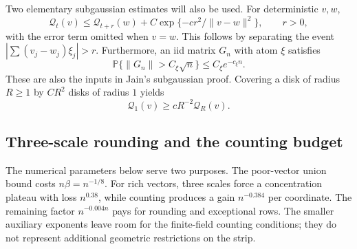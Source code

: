 \documentclass[11pt,reqno]{amsart}
\numberwithin{equation}{section}
\theoremstyle{plain}
\theoremstyle{definition}
\theoremstyle{remark}
\providecommand{\blsvP}{\mathbb P}
\providecommand{\blsvQ}{\mathcal Q}
\begin{document}
Two elementary subgaussian estimates will also be used. For deterministic
$v,w$,
\begin{equation}\label{blsv:eq-perturb-q}
 \blsvQ_t(v)\le\blsvQ_{t+r}(w)
       +C\exp\{-cr^2/\|v-w\|^2\},\qquad r>0,
\end{equation}
with the error term omitted when $v=w$. This follows by separating the
event $|\sum(v_j-w_j)\xi_j|>r$. Furthermore, an iid matrix $G_n$ with
atom $\xi$ satisfies
\begin{equation}\label{blsv:eq-norm-iid}
 \blsvP\{\|G_n\|>C_\xi\sqrt n\}\le C_\xi e^{-c_\xi n}.
\end{equation}
These are also the inputs in Jain's subgaussian proof. Covering a disk
of radius $R\ge1$ by $CR^2$ disks of radius $1$ yields
\begin{equation}\label{blsv:eq-cover-q}
 \blsvQ_1(v)\ge cR^{-2}\blsvQ_R(v).
\end{equation}



\subsection{Three-scale rounding and the counting budget}
The numerical parameters below serve two purposes. The poor-vector
union bound costs $n\beta=n^{-1/8}$. For rich vectors, three scales
force a concentration plateau with loss $n^{0.38}$, while counting
produces a gain $n^{-0.384}$ per coordinate. The remaining factor
$n^{-0.004n}$ pays for rounding and exceptional rows. The smaller
auxiliary exponents leave room for the finite-field counting conditions;
they do not represent additional geometric restrictions on the strip.
\end{document}
